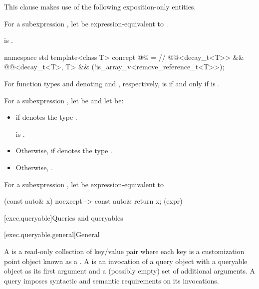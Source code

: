 \pnum
This clause makes use of the following exposition-only entities.

\pnum
For a subexpression ,
let  be
expression-equivalent to .

\mandates
{} is .

\pnum
\begin{codeblock}
namespace std {
  template<class T>
    concept @@ =                                     // \expos
      @@<decay_t<T>> &&
      @@<decay_t<T>, T> &&
      (!is_array_v<remove_reference_t<T>>);
}
\end{codeblock}

\pnum
For function types  and  denoting
 and , respectively,
 is  if and only if
is .

\pnum
For a subexpression ,
let  be  and
let  be:
\begin{itemize}
\item
{} if  denotes the type .

\expects
{} is .
\item
Otherwise,
if  denotes the type .
\item
Otherwise, .
\end{itemize}

\pnum
For a subexpression ,
let  be expression-equivalent to
\begin{codeblock}
[](const auto& x) noexcept -> const auto& { return x; }(expr)
\end{codeblock}

[exec.queryable]{Queries and queryables}

[exec.queryable.general]{General}

\pnum
A  is
a read-only collection of key/value pair
where each key is a customization point object known as a .
A  is an invocation of a query object
with a queryable object as its first argument and
a (possibly empty) set of additional arguments.
A query imposes syntactic and semantic requirements on its invocations.

